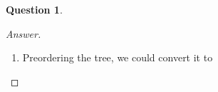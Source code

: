 \documentclass{article}
\theoremstyle{plain}
\newtheorem{question}{Question}
\newenvironment{answer}[1][Answer]
    {\begin{proof}[#1]{$ $}\renewcommand\qedsymbol{$\vartriangle$}}
    {\end{proof}}
\begin{document}
\begin{question}
\end{question}
\begin{answer}
    \begin{enumerate}
        \item Preordering the tree, we could convert it to
        \begin{equation*}
            [(C,5), (E,4), (A,10), (D,20), (B,2)]
        \end{equation*}
    \end{enumerate}
\end{answer}
\end{document}
